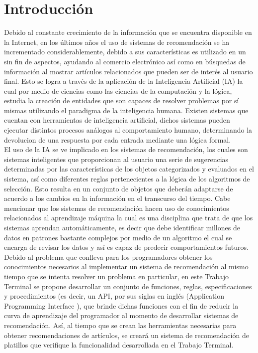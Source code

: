 \chapter{Introducción}
	Debido al constante crecimiento de la información que se encuentra disponible en la Internet, en los últimos años el uso de sistemas de recomendación se ha incrementado considerablemente, debido a sus características es utilizado en un sin fin de aspectos, ayudando al comercio electrónico así como en búsquedas de información al mostrar artículos relacionados que pueden ser de interés al usuario final. Esto se logra a través de la aplicación de la Inteligencia Artificial (IA) la cual por medio de ciencias como las ciencias de la computación y la lógica, estudia la creación de entidades que son capaces de resolver problemas por sí mismas utilizando el paradigma de la inteligencia humana. Existen sistemas que cuentan con herramientas de inteligencia artificial, dichos sistemas pueden ejecutar distintos procesos análogos al comportamiento humano, determinando la devolucion de una respuesta por cada entrada mediante una lógica formal. \cite{1}\\

	El uso de la IA se ve implicado en los sistemas de recomendación, los cuales son sistemas inteligentes que proporcionan al usuario una serie de sugerencias determinadas por las características de los objetos categorizados y evaluados en el sistema, así como diferentes reglas pertenecientes a la lógica de los algoritmos de selección. Esto resulta en un conjunto de objetos que deberán adaptarse de acuerdo a los cambios en la información en el transcurso del tiempo. Cabe mencionar que los sistemas de recomendación hacen uso de conocimientos relacionados al aprendizaje máquina la cual es una disciplina que trata de que los sistemas aprendan automáticamente, es decir que debe identificar millones de datos en patrones bastante complejos por medio de un algoritmo el cual se encarga de revisar los datos y así es capaz de predecir comportamientos futuros. \cite{2}\\

	Debido al problema que conlleva para los programadores obtener los conocimientos necesarios al implementar un sistema de recomendación al mismo tiempo que se intenta resolver un problema en particular, en este Trabajo Terminal se propone desarrollar un conjunto de funciones, reglas, especificaciones y procedimientos (es decir, un API, por sus siglas en inglés (Application Programming Interface ), que brinde dichas funciones con el fin de reducir la curva de aprendizaje del programador al momento de desarrollar sistemas de recomendación. \cite{3} Así, al tiempo que se crean las herramientas necesarias para obtener recomendaciones de artículos, se creará un sistema de recomendación de platillos que verifique la funcionalidad desarrollada en el Trabajo Terminal. 
